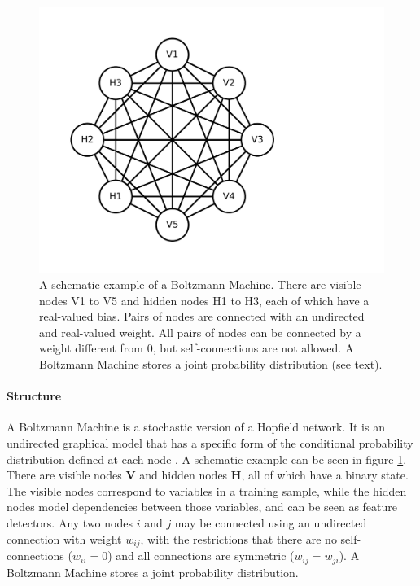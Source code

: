 \begin{figure}
\begin{centering}
\includegraphics[width=0.6\columnwidth]{images/boltzmann-machine-example}
\par\end{centering}
\caption[A schematic example of a Boltzmann Machine.]{\label{fig:Boltzmann-Machine-schema}A schematic example of a Boltzmann
Machine.  There are visible nodes V1 to V5 and hidden nodes H1 to
H3, each of which have a real-valued bias. Pairs of nodes are connected
with an undirected and real-valued weight. All pairs of nodes can
be connected by a weight different from 0, but self-connections are
not allowed. A Boltzmann Machine stores a joint probability distribution
(see text).}
\end{figure}

\paragraph{Structure}

A Boltzmann Machine is a stochastic version
of a Hopfield network. It is an undirected graphical model that has
a specific form of the conditional probability distribution defined
at each node \cite{Neal1992}. A schematic example can be seen in
figure \ref{fig:Boltzmann-Machine-schema}. There are visible nodes
\textbf{$\mathbf{V}$} and hidden nodes $\mathbf{H}$, all of which
have a binary state. The visible nodes correspond to variables in
a training sample, while the hidden nodes model dependencies between
those variables, and can be seen as feature detectors. Any two nodes
$i$ and $j$ may be connected using an undirected connection with
weight $w_{ij}$, with the restrictions that there are no self-connections
($w_{ii}=0$) and all connections are symmetric ($w_{ij}=w_{ji}$).
A Boltzmann Machine stores a joint probability distribution. 

